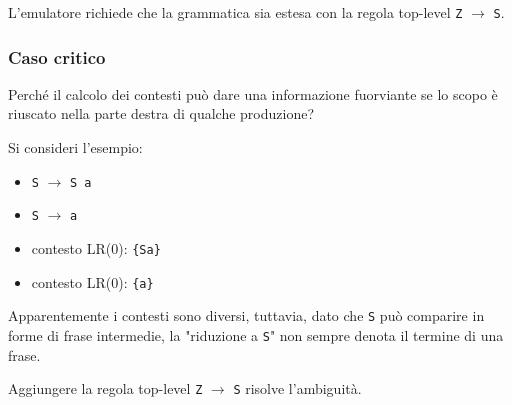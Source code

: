L'emulatore richiede che la grammatica sia estesa con la regola top-level \texttt{Z} $\rightarrow$ \texttt{S}.

\subsubsection{Caso critico}
Perché il calcolo dei contesti può dare una informazione fuorviante se lo scopo è riuscato nella parte destra di qualche produzione?

Si consideri l'esempio:

\begin{multicols}{2}
    \begin{itemize}
        \item \texttt{S} $\rightarrow$ \texttt{S a}
        \item \texttt{S} $\rightarrow$ \texttt{a}
    \end{itemize}
    \columnbreak
    \begin{itemize}
        \item[] contesto LR(0): \texttt{\{Sa\}}
        \item[] contesto LR(0): \texttt{\{a\}}
    \end{itemize}
\end{multicols}
\setlist{}

Apparentemente i contesti sono diversi, tuttavia, dato che \texttt{S} può comparire in forme di frase intermedie, la "riduzione a \texttt{S}" non sempre denota il termine di una frase.

Aggiungere la regola top-level \texttt{Z} $\rightarrow$ \texttt{S} risolve l'ambiguità.

